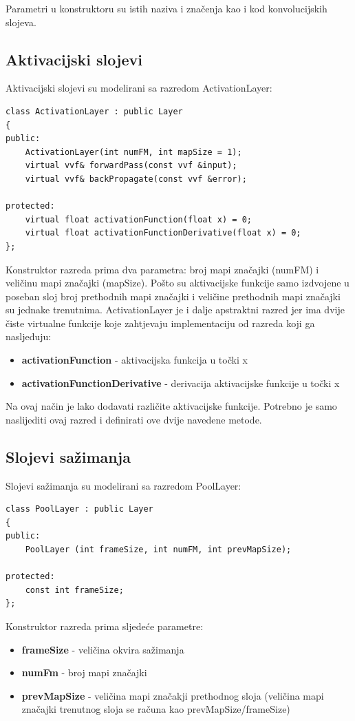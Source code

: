 \documentclass[times, utf8, zavrsni, numeric]{fer}
\begin{document}
Parametri u konstruktoru su istih naziva i značenja kao i kod konvolucijskih slojeva.

\subsection{Aktivacijski slojevi}
Aktivacijski slojevi su modelirani sa razredom ActivationLayer:
\begin{lstlisting}[caption=Razred ActivationLayer,
  label=ActivationLayer]
class ActivationLayer : public Layer
{
public:
    ActivationLayer(int numFM, int mapSize = 1);
    virtual vvf& forwardPass(const vvf &input);
    virtual vvf& backPropagate(const vvf &error);

protected:
    virtual float activationFunction(float x) = 0;
    virtual float activationFunctionDerivative(float x) = 0;
};
\end{lstlisting}

Konstruktor razreda prima dva parametra: broj mapi značajki (numFM) i veličinu mapi značajki (mapSize). Pošto su aktivacijske funkcije samo izdvojene u poseban sloj broj prethodnih mapi značajki i veličine prethodnih mapi značajki su jednake trenutnima. ActivationLayer je i dalje apstraktni razred jer ima dvije čiste virtualne funkcije koje zahtjevaju implementaciju od razreda koji ga nasljeđuju:
\begin{itemize}
\item \textbf{activationFunction} - aktivacijska funkcija u točki x
\item \textbf{activationFunctionDerivative} - derivacija aktivacijske funkcije u točki x
\end{itemize}
Na ovaj način je lako dodavati različite aktivacijske funkcije. Potrebno je samo naslijediti ovaj razred i definirati ove dvije navedene metode.


\subsection{Slojevi sažimanja}
Slojevi sažimanja su modelirani sa razredom PoolLayer:
\begin{lstlisting}[caption=Razred PoolLayer,
  label=PoolLayer]
class PoolLayer : public Layer
{
public:
    PoolLayer (int frameSize, int numFM, int prevMapSize); 

protected:
    const int frameSize;
};
\end{lstlisting}

Konstruktor razreda prima sljedeće parametre:
\begin{itemize}
\item \textbf{frameSize} - veličina okvira sažimanja
\item \textbf{numFm} - broj mapi značajki
\item \textbf{prevMapSize} - veličina mapi značakji prethodnog sloja (veličina mapi značajki trenutnog sloja se računa kao prevMapSize/frameSize)
\end{itemize}
\end{document}
